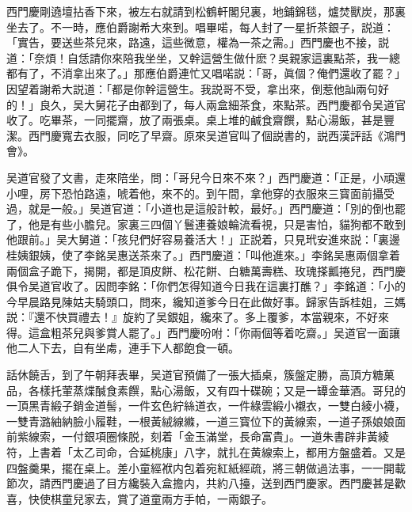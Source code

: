 西門慶剛遶壇拈香下來，被左右就請到松鶴軒閣兒裏，地鋪錦毯，爐焚獸炭，那裏坐去了。不一時，應伯爵謝希大來到。唱畢喏，每人封了一星折茶銀子，説道：「實告，要送些茶兒來，路遠，這些微意，權為一茶之需。」西門慶也不接，説道：「奈煩！自恁請你來陪我坐坐，又幹這營生做什麽？吳親家這裏點茶，我一總都有了，不消拿出來了。」那應伯爵連忙又唱喏説：「哥，眞個？俺們還收了罷？」因望着謝希大説道：「都是你幹這營生。我説哥不受，拿出來，倒惹他訕兩句好的！」良久，吴大舅花子由都到了，每人兩盒細茶食，來點茶。西門慶都令吴道官收了。吃畢茶，一同擺齋，放了兩張桌。桌上堆的鹹食齋饌，點心湯飯，甚是豐潔。西門慶寬去衣服，同吃了早齋。原來吴道官叫了個説書的，説西漢評話《鴻門會》。

吴道官發了文書，走來陪坐，問：「哥兒今日來不來？」西門慶道：「正是，小頑還小哩，房下恐怕路遠，唬着他，來不的。到午間，拿他穿的衣服來三寳面前攝受過，就是一般。」吴道官道：「小道也是這般計較，最好。」西門慶道：「別的倒也罷了，他是有些小膽兒。家裏三四個丫鬟連養娘輪流看視，只是害怕，貓狗都不敢到他跟前。」吴大舅道：「孩兒們好容易養活大！」正説着，只見玳安進來説：「裏邊桂姨銀姨，使了李銘吴惠送茶來了。」西門慶道：「叫他進來。」李銘吴惠兩個拿着兩個盒子跪下，揭開，都是頂皮餅、松花餅、白糖萬壽糕、玫瑰搽瓤捲兒，西門慶俱令吴道官收了。因問李銘：「你們怎得知道今日我在這裏打醮？」李銘道：「小的今早晨路見陳姑夫騎頭口，問來，纔知道爹今日在此做好事。歸家告訴桂姐，三媽説：『還不快買禮去！』旋約了吴銀姐，纔來了。多上覆爹，本當親來，不好來得。這盒粗茶兒與爹賞人罷了。」西門慶吩咐：「你兩個等着吃齋。」吴道官一面讓他二人下去，自有坐䖏，連手下人都飽食一頓。

話休饒舌，到了午朝拜表畢，吴道官預備了一張大插桌，簇盤定勝，高頂方糖菓品，各樣托葷蒸煠醎食素饌，點心湯飯，又有四十碟碗；又是一罈金華酒。哥兒的一頂黑青緞子銷金道髻，一件玄色紵絲道衣，一件綠雲緞小襯衣，一雙白綾小襪，一雙青潞紬納臉小履鞋，一根黃絨線縧，一道三寳位下的黃線索，一道子孫娘娘面前紫線索，一付銀項圈條脱，刻着「金玉滿堂，長命富貴」。一道朱書辟非黃綾符，上書着「太乙司命，合延桃康」八字，就扎在黄線索上，都用方盤盛着。又是四盤羹果，擺在桌上。差小童經袱内包着宛紅紙經疏，將三朝做過法事，一一開載節次，請西門慶過了目方纔裝入盒擔内，共約八擡，送到西門慶家。西門慶甚是歡喜，快使棋童兒家去，賞了道童兩方手帕，一兩銀子。

